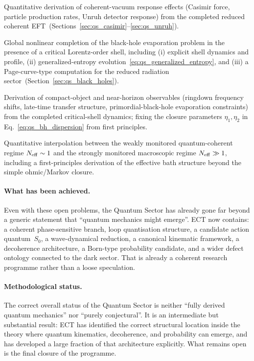 \begin{description}[leftmargin=2.2em]
  \item[OP-Q12] Quantitative derivation of coherent-vacuum response
    effects (Casimir force, particle production rates, Unruh detector
    response) from the completed reduced coherent
    EFT~(Sections~\ref{sec:qs_casimir}--\ref{sec:qs_unruh}).
  \item[OP-Q13] Global nonlinear completion of the black-hole
    evaporation problem in the presence of a critical Lorentz-order
    shell, including
    (i) explicit shell dynamics and profile,
    (ii) generalized-entropy evolution~\eqref{eq:qs_generalized_entropy},
    and (iii) a Page-curve-type computation for the reduced radiation
    sector~(Section~\ref{sec:qs_black_holes}).
  \item[OP-Q14] Derivation of compact-object and near-horizon
    observables (ringdown frequency shifts, late-time transfer
    structure, primordial-black-hole evaporation constraints) from
    the completed critical-shell dynamics;
    fixing the closure parameters $\eta_1,\eta_2$ in
    Eq.~\eqref{eq:qs_bh_dispersion} from first principles.
  \item[OP-Q15] Quantitative interpolation between the weakly
    monitored quantum-coherent regime $N_{\rm eff}\sim1$ and the
    strongly monitored macroscopic regime $N_{\rm eff}\gg1$,
    including a first-principles derivation of the effective bath
    structure beyond the simple ohmic/Markov closure.
\end{description}

\paragraph{What has been achieved.}
Even with these open problems, the Quantum Sector has already gone far
beyond a generic statement that ``quantum mechanics might emerge''.
ECT now contains:
a coherent phase-sensitive branch,
loop quantisation structure,
a candidate action quantum~$S_0$,
a wave-dynamical reduction,
a canonical kinematic framework,
a decoherence architecture,
a Born-type probability candidate,
and a wider defect ontology connected to the dark sector.
That is already a coherent research programme rather than a loose
speculation.

\paragraph{Methodological status.}
The correct overall status of the Quantum Sector is neither ``fully
derived quantum mechanics'' nor ``purely conjectural''.
It is an intermediate but substantial result: ECT has identified the
correct structural location inside the theory where quantum kinematics,
decoherence, and probability can emerge, and has developed a large
fraction of that architecture explicitly.
What remains open is the final closure of the programme.

